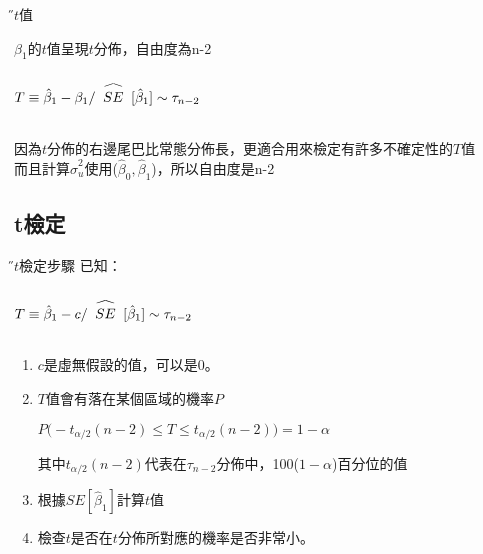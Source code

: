 \documentclass[xcolor=dvipsnames]{beamer}
\newcommand\reallywidehat[1]{%
\begin{array}{c}
\stretchto{
  \scaleto{
    \scalerel*[\widthof{#1}]{\bigwedge}
    {\rule[-\textheight/2]{1ex}{\textheight}} %
  }{1.25\textheight} %
}{0.5ex}\\           %
#1\\                 %
\rule{-1ex}{0ex}
\end{array}
}
\begin{document}
\begin{frame}{\H $t$值}
\begin{theorem}[t值的抽樣分佈]
$\beta_{1}$的$t$值呈現$t$分佈，自由度為n-2
\begin{center}
$T\equiv \hat{\beta}_{1}-\beta_{1}/\reallywidehat{SE}[\hat{\beta}_{1}]\sim \tau_{n-2}$
\end{center}
\end{theorem}
因為$t$分佈的右邊尾巴比常態分佈長，更適合用來檢定有許多不確定性的$T$值\\
\medskip
而且計算$\hat{\sigma}_{u}^2$使用($\hat{\beta}_{0},\hat{\beta}_{1}$)，所以自由度是n-2
\end{frame}
\subsection{t檢定}
\begin{frame}{\H $t$檢定步驟}
已知：
\begin{center}
$T\equiv \hat{\beta}_{1}-c/\reallywidehat{SE}[\hat{\beta}_{1}]\sim \tau_{n-2}$
\end{center}
\begin{enumerate}
\item $c$是虛無假設的值，可以是0。
\item $T$值會有落在某個區域的機率$P$
\begin{center}
$P\big(-t_{\alpha/2}(n-2)\leq T \leq t_{\alpha/2}(n-2)\big)=1-\alpha$
\end{center}
其中$t_{\alpha/2}(n-2)$代表在$\tau_{n-2}$分佈中，100($1-\alpha$)百分位的值
\item 根據$SE[\hat{\beta}_{1}]$計算$t$值
\item 檢查$t$是否在$t$分佈所對應的機率是否非常小。
\end{enumerate}
\end{frame}
\end{document}
